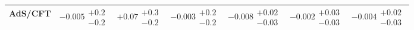 \begin{table}[H]
\begin{tabular}{lllllll}
AdS/CFT & $-0.005\substack{+0.2 \\ -0.2}$ & $+0.07\substack{+0.3 \\ -0.2}$ & $-0.003\substack{+0.2 \\ -0.2}$ & $-0.008\substack{+0.02 \\ -0.03}$ & $-0.002\substack{+0.03 \\ -0.03}$ & $-0.004\substack{+0.02 \\ -0.03}$ \\
\bottomrule
\end{tabular}\normalsize\renewcommand{\arraystretch}{1}
\end{table}
